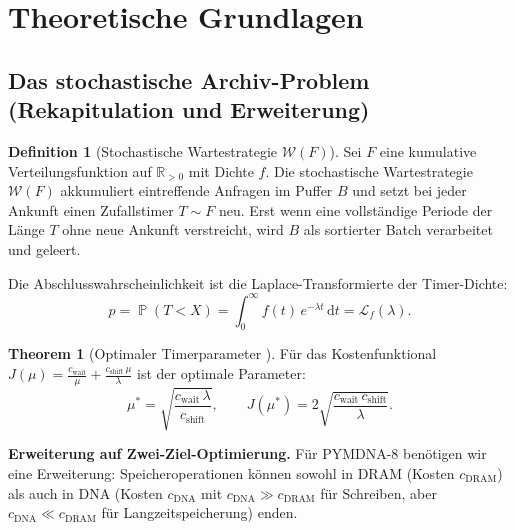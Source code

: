 ﻿\documentclass[a4paper,12pt]{article}
\theoremstyle{definition}
\newtheorem{definition}{Definition}[section]
\newtheorem{theorem}{Theorem}[section]
\DeclareMathOperator{\Prob}{\mathbb{P}}
\begin{document}
\section{Theoretische Grundlagen}

\subsection{Das stochastische Archiv-Problem (Rekapitulation und Erweiterung)}

\begin{definition}[Stochastische Wartestrategie $\mathcal{W}(F)$]
  \label{def:waitstrat}
  Sei $F$ eine kumulative Verteilungsfunktion auf $\mathbb{R}_{>0}$ mit Dichte $f$.
  Die stochastische Wartestrategie $\mathcal{W}(F)$ akkumuliert eintreffende
  Anfragen im Puffer $B$ und setzt bei jeder Ankunft einen Zufallstimer $T \sim F$
  neu. Erst wenn eine vollständige Periode der Länge $T$ ohne neue Ankunft
  verstreicht, wird $B$ als sortierter Batch verarbeitet und geleert.
\end{definition}

Die Abschlusswahrscheinlichkeit ist die Laplace-Transformierte der Timer-Dichte:
\begin{equation}
  p = \Prob(T < X) = \int_0^\infty f(t)\,e^{-\lambda t}\,\mathrm{d}t
  = \mathcal{L}_f(\lambda).
  \label{eq:abschluss}
\end{equation}

\begin{theorem}[Optimaler Timerparameter \cite{epp2026pymca8}]
  \label{thm:optmu}
  Für das Kostenfunktional
  $J(\mu) = \frac{c_{\mathrm{wait}}}{\mu} + \frac{c_{\mathrm{shift}}\,\mu}{\lambda}$
  ist der optimale Parameter:
  \begin{equation}
    \mu^* = \sqrt{\frac{c_{\mathrm{wait}}\,\lambda}{c_{\mathrm{shift}}}},
    \qquad J(\mu^*) = 2\sqrt{\frac{c_{\mathrm{wait}}\,c_{\mathrm{shift}}}{\lambda}}.
    \label{eq:muopt}
  \end{equation}
\end{theorem}

\textbf{Erweiterung auf Zwei-Ziel-Optimierung.}
Für PYMDNA-8 benötigen wir eine Erweiterung: Speicheroperationen können
sowohl in DRAM (Kosten $c_{\mathrm{DRAM}}$) als auch in DNA (Kosten $c_{\mathrm{DNA}}$
mit $c_{\mathrm{DNA}} \gg c_{\mathrm{DRAM}}$ für Schreiben, aber $c_{\mathrm{DNA}} \ll c_{\mathrm{DRAM}}$
für Langzeitspeicherung) enden.
\end{document}
